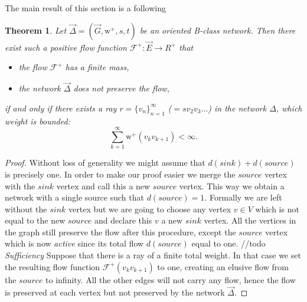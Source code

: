 \documentclass[12pt]{article}
\newtheorem{theorem}{Theorem}
\theoremstyle{definition}
\newcommand{\seq}[1]{\{{#1}_n\}_{n=1}^\infty}
\newcommand{\wtp}{\mathrm{w}^{+}}
\newcommand{\flowpos}{\mathcal{F}^{+}}
\newcommand{\source}{\mathit{source}}
\newcommand{\sink}{\mathit{sink}}
\newcommand{\net}{\Delta}
\newcommand{\onet}{\vec{\Delta}}
\numberwithin{remark}{section}
\numberwithin{theorem}{section}
\numberwithin{prop}{section}
\numberwithin{equation}{section}
\numberwithin{lemma}{section}
\numberwithin{prop_under_lemma}{lemma}
\begin{document}
    The main result of this section is a following
    \begin{theorem}
      Let $\onet = (\vec{G}, \wtp, s, t)$ be an oriented B-class network.
      Then there exist such a positive flow function $\flowpos: \vec{E} \to R^{+}$ that
      \begin{itemize}
        \item the flow $\flowpos$ has a finite mass,
        \item the network $\onet$ does not preserve the flow,
      \end{itemize}
        if and only if there exists a ray $r = \seq{v}$ ($=sv_2v_3\dots$)
        in the network $\net$, which weight is bounded:
        $$
          \sum_{k=1}^\infty \wtp(v_k v_{k+1}) < \infty.
        $$
    \end{theorem}
    \begin{proof}
      Without loss of generality we might assume that $d(\sink) + d(\source)$ is precisely one.
      In order to make our proof easier we merge the $\source$ vertex with the $\sink$ vertex and call this a
        new $\source$ vertex.
      This way we obtain a network with a single source such that $d(\source) = 1$.
      Formally we are left without the $\sink$ vertex but we are going to choose any vertex $v \in V$ which
        is not equal to the new $\source$ and declare this $v$ a new $\sink$ vertex.
      All the vertices in the graph still preserve the flow after this procedure, except the $\source$ vertex
        which is now \emph{active} since its total flow $d(\source)$ equal to one.
      //todo
      \noindent\textit{Sufficiency}
      Suppose that there is a ray of a finite total weight. 
      In that case we set the resulting flow function $\flowpos(v_k v_{k+1})$ to one, creating an elusive flow
        from the $\source$ to infinity. All the other edges will not carry any flow, hence the flow is preserved
        at each vertex but not preserved by the network $\onet$.


\end{proof}
\end{document}

